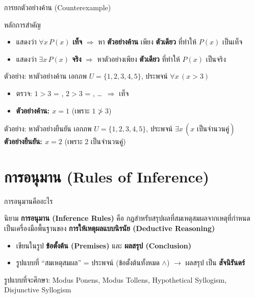 \begin{frame}{การยกตัวอย่างค้าน (Counterexample)}
  \begin{alertblock}{หลักการสำคัญ}
    \begin{itemize}
      \item แสดงว่า $\forall x\,P(x)$ \textbf{เท็จ} $\Rightarrow$ หา \textbf{ตัวอย่างค้าน} เพียง \textbf{ตัวเดียว} ที่ทำให้ $P(x)$ เป็นเท็จ
      \item แสดงว่า $\exists x\,P(x)$ \textbf{จริง} $\Rightarrow$ หาตัวอย่างเพียง \textbf{ตัวเดียว} ที่ทำให้ $P(x)$ เป็นจริง
    \end{itemize}
  \end{alertblock}
  \vspace{0.4em}
  \begin{exampleblock}{ตัวอย่าง: หาตัวอย่างค้าน}
    เอกภพ $U = \{1, 2, 3, 4, 5\}$, ประพจน์ $\forall x\,(x > 3)$
    \begin{itemize}
      \item ตรวจ: $1>3$ = \FF, $2>3$ = \FF, \ldots\ $\Rightarrow$ เท็จ
      \item \textbf{ตัวอย่างค้าน: $x = 1$} (เพราะ $1 \not> 3$)
    \end{itemize}
  \end{exampleblock}
  \begin{exampleblock}{ตัวอย่าง: หาตัวอย่างยืนยัน}
    เอกภพ $U = \{1, 2, 3, 4, 5\}$, ประพจน์ $\exists x\,(x \text{ เป็นจำนวนคู่})$ \\
    \textbf{ตัวอย่างยืนยัน: $x = 2$} (เพราะ 2 เป็นจำนวนคู่)
  \end{exampleblock}
\end{frame}


\section{การอนุมาน (Rules of Inference)}

\begin{frame}{การอนุมานคืออะไร}
  \begin{block}{นิยาม}
    \textbf{การอนุมาน (Inference Rules)} คือ กฎสำหรับสรุปผลที่สมเหตุสมผลจากเหตุที่กำหนด
    เป็นเครื่องมือพื้นฐานของ \textbf{การให้เหตุผลแบบนิรนัย (Deductive Reasoning)}
  \end{block}
  \vspace{0.4em}
  \begin{itemize}
    \item เขียนในรูป \textbf{ข้อตั้งต้น (Premises)} และ \textbf{ผลสรุป (Conclusion)}
    \item รูปแบบที่ ``สมเหตุสมผล'' = ประพจน์ (ข้อตั้งต้นทั้งหมด $\land$) $\rightarrow$ ผลสรุป เป็น \textbf{สัจนิรันดร์}
  \end{itemize}
  \vspace{0.4em}
  รูปแบบที่จะศึกษา: Modus Ponens, Modus Tollens, Hypothetical Syllogism, Disjunctive Syllogism
\end{frame}

